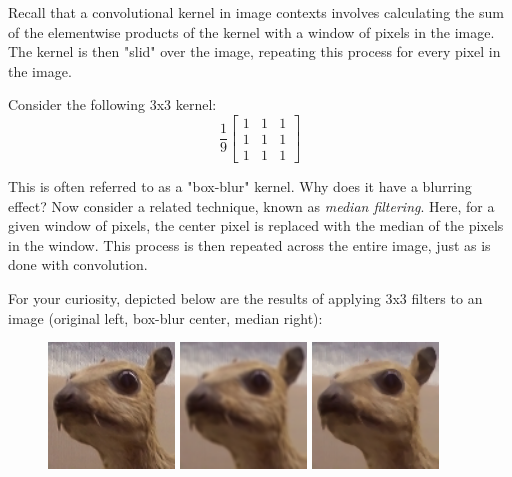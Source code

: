\documentclass[11pt]{article}
\begin{document}

Recall that a convolutional kernel in image contexts involves calculating the sum of the elementwise products of the kernel with a window of pixels in the image. The kernel is then "slid" over the image, repeating this process for every pixel in the image.

\begin{subparts}
    \subpart Consider the following 3x3 kernel:
    $$\frac{1}{9} \begin{bmatrix}
    1 & 1 & 1 \\
    1 & 1 & 1 \\
    1 & 1 & 1
    \end{bmatrix}$$

    This is often referred to as a "box-blur" kernel. Why does it have a blurring effect? 
    \subpart Now consider a related technique, known as \emph{median filtering}. Here, for a given window of pixels, the center pixel is replaced with the median of the pixels in the window. This process is then repeated across the entire image, just as is done with convolution.
    
    For your curiosity, depicted below are the results of applying 3x3 filters to an image (original left, box-blur center, median right):
    \begin{figure}[h] \centering
        \includegraphics[width=0.3\textwidth]{orig.png}
        \includegraphics[width=0.3\textwidth]{box_blur.png}
        \includegraphics[width=0.3\textwidth]{median_filtered.png}
    \end{figure}


\end{subparts}
\end{document}
